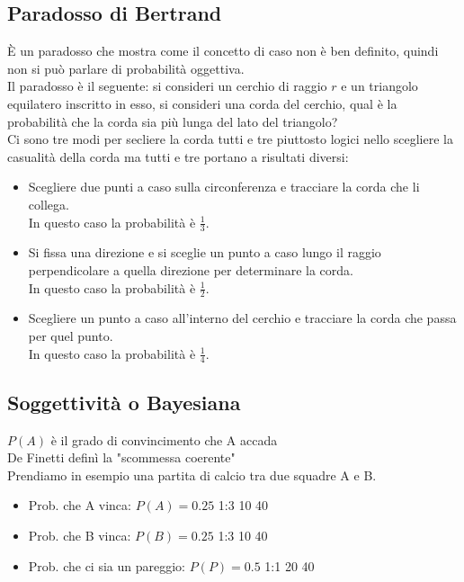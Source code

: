 \documentclass[a4paper, oneside]{article}
\newcommand{\tab}{\hspace*{2em}}
\begin{document}
\subsection{Paradosso di Bertrand}
È un paradosso che mostra come il concetto di caso non è ben definito, quindi non si può parlare di probabilità oggettiva.\\

Il paradosso è il seguente: si consideri un cerchio di raggio $r$ e un triangolo equilatero inscritto in esso, si consideri una corda del cerchio, qual è la probabilità che la corda sia più lunga del lato del triangolo?\\

Ci sono tre modi per secliere la corda tutti e tre piuttosto logici nello scegliere la casualità della corda ma tutti e tre portano a risultati diversi:
\begin{itemize}
    \item Scegliere due punti a caso sulla circonferenza e tracciare la corda che li collega.\\
    In questo caso la probabilità è $\frac{1}{3}$.
    \item Si fissa una direzione e si sceglie un punto a caso lungo il raggio perpendicolare a quella direzione per determinare la corda.\\
    In questo caso la probabilità è $\frac{1}{2}$.
    \item Scegliere un punto a caso all'interno del cerchio e tracciare la corda che passa per quel punto.\\
    In questo caso la probabilità è $\frac{1}{4}$.
\end{itemize}

\subsection{Soggettività o Bayesiana}
$P(A)$ è il grado di convincimento che A accada\\

De Finetti definì la "scommessa coerente"\\
Prendiamo in esempio una partita di calcio tra due squadre A e B.
\begin{itemize}
    \item Prob. che A vinca: $P(A)=0.25$ \tab 1:3 \tab 10 \tab 40
    \item Prob. che B vinca: $P(B)=0.25$ \tab 1:3 \tab 10 \tab 40
    \item Prob. che ci sia un pareggio: $P(P)=0.5$ \tab 1:1 \tab 20 \tab 40 %
\end{itemize} 
\end{document}
